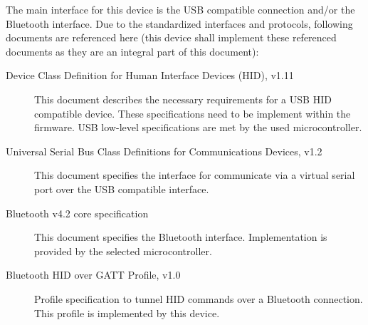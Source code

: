 \documentclass[]{scrreprt}%
\begin{document}
The main interface for this device is the USB compatible connection and/or the Bluetooth interface.
Due to the standardized interfaces and protocols, following documents are referenced here (this device shall implement these
referenced documents as they are an integral part of this document):

\begin{description}
 \item[Device Class Definition for Human Interface Devices (HID), v1.11] This document describes the necessary requirements for a USB HID compatible device. These specifications need to be implement within the firmware. USB low-level specifications are met by the used microcontroller.
 \item[Universal Serial Bus Class Definitions for Communications Devices, v1.2] This document specifies the interface for communicate via a virtual serial port over the USB compatible interface.
 \item[Bluetooth v4.2 core specification] This document specifies the Bluetooth interface. Implementation is provided by the selected microcontroller.
 \item[Bluetooth HID over GATT Profile, v1.0] Profile specification to tunnel HID commands over a Bluetooth connection. This profile is
 implemented by this device.
\end{description}
\end{document}
